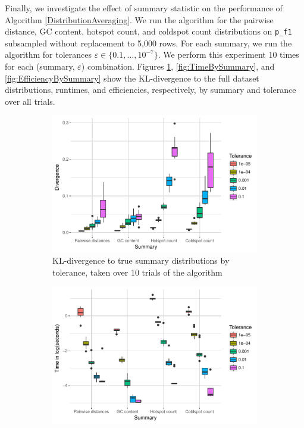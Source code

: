 \documentclass{article}
\begin{document}
Finally, we investigate the effect of summary statistic on the performance of Algorithm \ref{DistributionAveraging}.
We run the algorithm for the pairwise distance, GC content, hotspot count, and coldspot count distributions on \texttt{p\_f1} subsampled without replacement to 5,000 rows.
For each summary, we run the algorithm for tolerances $\varepsilon \in \{0.1, \dotsc, 10^{-7}\}$.
We perform this experiment 10 times for each (summary, $\varepsilon$) combination.
Figures \ref{fig:DivBySummary}, \ref{fig:TimeBySummary}, and \ref{fig:EfficiencyBySummary} show the KL-divergence to the full dataset distributions, runtimes, and efficiencies, respectively, by summary and tolerance over all trials.
\begin{figure}
    \begin{subfigure}{0.5\textwidth}
        \includegraphics[width=\linewidth]{Figures/Multiple/div_by_summary_and_tol.pdf}
        \caption{KL-divergence to true summary distributions by tolerance, taken over 10 trials of the algorithm}
        \label{fig:DivBySummary}
    \end{subfigure}
    \begin{subfigure}{0.5\textwidth}
        \includegraphics[width=\linewidth]{Figures/Multiple/time_by_summary_and_tol.pdf}

\end{subfigure}
\end{figure}
\end{document}
